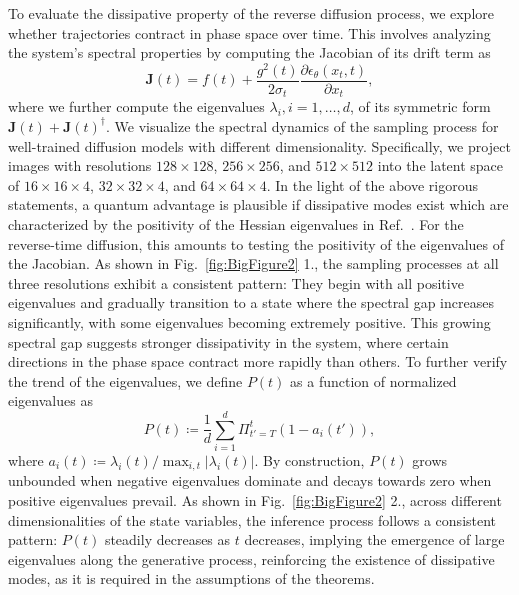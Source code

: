 To evaluate the dissipative property of the reverse diffusion process, we 
explore whether trajectories contract in phase space over time. This involves analyzing the system's spectral properties by computing the Jacobian of its drift term as
\begin{equation}
    \boldsymbol{J}(t) = f(t) + \frac{g^2(t)}{2\sigma_t}\frac{\partial  \epsilon_{\theta}(x_t,t)}{\partial x_t},
\end{equation}
where we further compute the eigenvalues $\lambda_i, i=1,\dots, d$, of its symmetric form $\boldsymbol{J}(t) + \boldsymbol{J}(t)^\dagger$.
%
We visualize the spectral dynamics of the sampling process for well-trained diffusion models with different dimensionality.
Specifically, we project images with resolutions $128\times128$, $256\times256$, and $512\times512$ into the latent space of $16\times16\times4$, $32\times32\times4$, and $64\times64\times4$.
In the light of the above rigorous statements, 
a quantum advantage is plausible if dissipative
modes exist which are 
characterized by the positivity of the Hessian eigenvalues in Ref.\ \cite{Liu:2023coc}. For the reverse-time diffusion, 
this amounts to testing the positivity of 
the eigenvalues of the Jacobian.
As shown in Fig.~\ref{fig:BigFigure2} 1.,
the sampling processes at all three resolutions exhibit a consistent pattern: They begin with all positive eigenvalues and gradually transition to a state where the spectral gap increases significantly, with some eigenvalues becoming extremely positive. This growing spectral gap suggests stronger dissipativity in the system, where certain directions in the phase space contract more rapidly than others.
To further verify the trend of the eigenvalues, we define $P(t)$ as a function of normalized eigenvalues as
\begin{equation}
P(t) \coloneqq \frac{1}{d}\sum_{i=1}^d \Pi_{t'=T}^t (1-a_i(t')),
\end{equation}
where $a_i(t) \coloneqq {\lambda_i(t)}/{\max_{i,t} |\lambda_i(t)|}$.
By construction, $P(t)$ grows unbounded when negative eigenvalues dominate and decays towards zero when positive eigenvalues prevail.
As shown in Fig.~\ref{fig:BigFigure2} 2., across different dimensionalities of the state variables, the inference process follows a consistent pattern: $P(t)$ steadily decreases as $t$ decreases, implying the emergence of large eigenvalues along the generative process, reinforcing the existence of dissipative modes, as it is required in the assumptions of the theorems.


